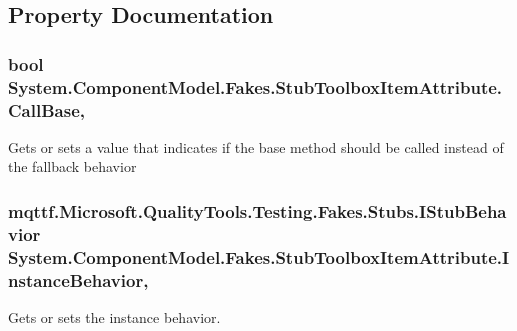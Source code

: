 \subsection{Property Documentation}
\hypertarget{class_system_1_1_component_model_1_1_fakes_1_1_stub_toolbox_item_attribute_a1d6cc0f1fa9e1741eb326214c785afa2}{
\subsubsection[{Call\-Base}]{\setlength{\rightskip}{0pt plus 5cm}bool System.\-Component\-Model.\-Fakes.\-Stub\-Toolbox\-Item\-Attribute.\-Call\-Base\hspace{0.3cm}{\ttfamily [get]}, {\ttfamily [set]}}}\label{class_system_1_1_component_model_1_1_fakes_1_1_stub_toolbox_item_attribute_a1d6cc0f1fa9e1741eb326214c785afa2}


Gets or sets a value that indicates if the base method should be called instead of the fallback behavior

\hypertarget{class_system_1_1_component_model_1_1_fakes_1_1_stub_toolbox_item_attribute_a430f0859b045b32cb28422af6f0017c5}{
\subsubsection[{Instance\-Behavior}]{\setlength{\rightskip}{0pt plus 5cm}mqttf.\-Microsoft.\-Quality\-Tools.\-Testing.\-Fakes.\-Stubs.\-I\-Stub\-Behavior System.\-Component\-Model.\-Fakes.\-Stub\-Toolbox\-Item\-Attribute.\-Instance\-Behavior\hspace{0.3cm}{\ttfamily [get]}, {\ttfamily [set]}}}\label{class_system_1_1_component_model_1_1_fakes_1_1_stub_toolbox_item_attribute_a430f0859b045b32cb28422af6f0017c5}


Gets or sets the instance behavior.

